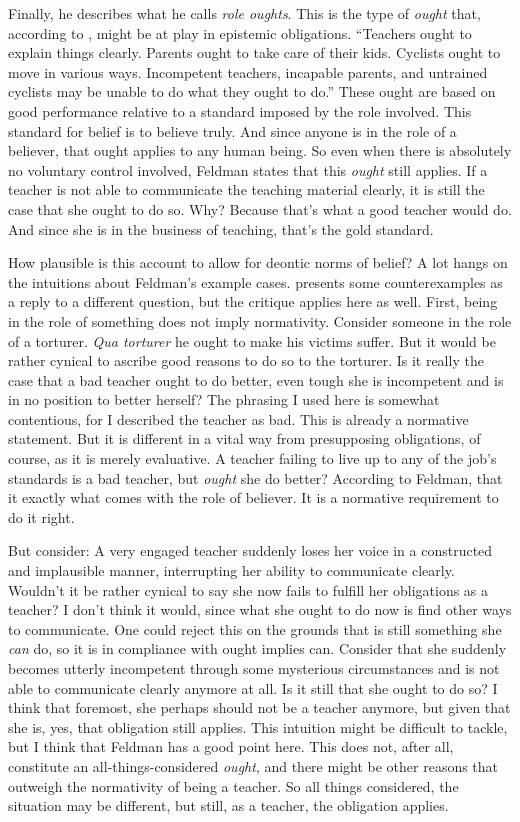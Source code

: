 \documentclass[12pt,numbers=noenddot]{scrartcl}
\begin{document}
Finally, he describes what he calls \emph{role oughts}. This is the type of \emph{ought} that, according to \textcite[676]{Feldman2001-FELVBA}, might be at play in epistemic obligations. “Teachers ought to explain things clearly. Parents ought to take care of their kids. Cyclists ought to move in various ways. Incompetent teachers, incapable parents, and untrained cyclists may be unable to do what they ought to do.” These ought are based on good performance relative to a standard imposed by the role involved. This standard for belief is to believe truly. And since anyone is in the role of a believer, that ought applies to any human being. So even when there is absolutely no voluntary control involved, Feldman states that this \emph{ought} still applies. If a teacher is not able to communicate the teaching material clearly, it is still the case that she ought to do so. Why? Because that's what a good teacher would do. And since she is in the business of teaching, that's the gold standard.

How plausible is this account to allow for deontic norms of belief? A lot hangs on the intuitions about Feldman's example cases.
\textcite[9]{Cote-BouchardForthcoming-CTBCTA} presents some counterexamples as a reply to a different question, but the critique applies here as well. First, being in the role of something does not imply normativity. Consider someone in the role of a torturer. \emph{Qua torturer} he ought to make his victims suffer. But it would be rather cynical to ascribe good reasons to do so to the torturer. Is it really the case that a bad teacher ought to do better, even tough she is incompetent and is in no position to better herself? The phrasing I used here is somewhat contentious, for I described the teacher as bad. This is already a normative statement. But it is different in a vital way from presupposing obligations, of course, as it is merely evaluative. A teacher failing to live up to any of the job's standards is a bad teacher, but \emph{ought} she do better? According to Feldman, that it exactly what comes with the role of believer. It is a normative requirement to do it right.

But consider: A very engaged teacher suddenly loses her voice in a constructed and implausible manner, interrupting her ability to communicate clearly. Wouldn't it be rather cynical to say she now fails to fulfill her obligations as a teacher? I don't think it would, since what she ought to do now is find other ways to communicate. One could reject this on the grounds that is still something she \emph{can} do, so it is in compliance with ought implies can. Consider that she suddenly becomes utterly incompetent through some mysterious circumstances and is not able to communicate clearly anymore at all. Is it still that she ought to do so? I think that foremost, she perhaps should not be a teacher anymore, but given that she is, yes, that obligation still applies. This intuition might be difficult to tackle, but I think that Feldman has a good point here. This does not, after all, constitute an all-things-considered \emph{ought}, and there might be other reasons that outweigh the normativity of being a teacher. So all things considered, the situation may be different, but still, as a teacher, the obligation applies.
\end{document}

